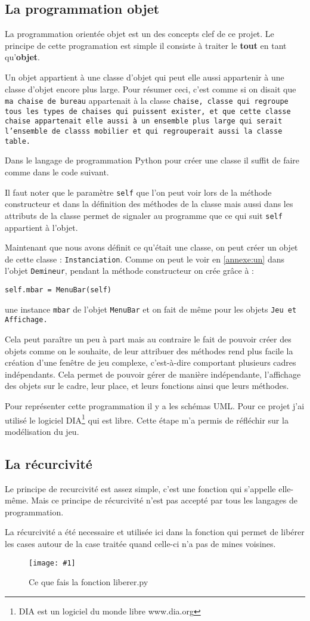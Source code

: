 \documentclass[a4paper,11pt]{article}
\newcommand{\moncode}[1]{}
\newcommand{\monimage}[4]{
\par\noindent
\begin{figure}[H] %
\begin{center}
\texttt{[image: \#1]} %
\caption{#2} %
\label{#3} %
\end{center}
\end{figure} %
}
\newcommand{\ml}[0]{\par\noindent}
\begin{document}
\subsection{La programmation objet}
La programmation orientée objet est un des concepts clef de ce projet. Le principe de cette programation est simple il consiste à  traiter 
le {\bf tout} en tant qu'{\bf objet}.
\ml
Un objet appartient à une classe d'objet qui peut elle aussi appartenir à une classe d'objet encore plus large.
Pour résumer ceci, c'est comme si on disait que {\tt ma chaise de bureau} appartenait à la classe \tt{chaise}, classe qui
regroupe tous les types de chaises qui puissent exister, et que cette classe {\tt chaise} appartenait elle aussi
à un ensemble plus large qui serait l'ensemble de classs {\tt mobilier} et qui regrouperait aussi la classe \tt{table}.
\ml
Dans le langage de programmation Python pour créer une classe il suffit de faire comme dans le code suivant.
\moncode{defclass.py}
Il faut noter que le paramètre {\tt self} que l'on peut voir lors de la méthode constructeur et dans la définition des 
méthodes de la classe mais aussi dans les attributs de la classe permet de signaler au programme que ce qui suit
{\tt self} appartient à l'objet.
\ml
Maintenant que nous avons définit ce qu'était une classe, on peut créer un objet de cette classe : {\tt Instanciation}.
Comme on peut le voir en \ref{annexe:un} dans l'objet {\tt Demineur}, pendant la méthode constructeur on crée grâce à :
\ml
{\tt self.mbar = MenuBar(self)}
\ml
 une instance {\tt mbar} de l'objet {\tt MenuBar} et on fait de même pour les objets \tt{Jeu} et \tt{Affichage}.
\ml
Cela peut paraître un peu à part mais au contraire le fait de pouvoir créer des objets comme on le souhaite, de leur attribuer
des méthodes rend plus facile la création d'une fenêtre de jeu complexe, c'est-à-dire comportant plusieurs cadres indépendants. Cela
permet de pouvoir gérer de manière indépendante, l'affichage des objets sur le cadre, leur place, et leurs fonctions ainsi que leurs méthodes.
\ml
Pour représenter cette programmation il y a les schémas UML. Pour ce projet j'ai utilisé le logiciel DIA\footnote{DIA est un logiciel du monde libre www.dia.org} qui est
libre. Cette étape m'a permis de réfléchir sur la modélisation du jeu.
\ml
\subsection{La récurcivité}
Le principe de recurcivité est assez simple, c'est une fonction qui s'appelle elle-même. Mais ce principe de récurcivité
n'est pas accepté par tous les langages de programmation. 
\ml
La récurcivité a été necessaire et utilisée ici dans la fonction qui permet de libérer les cases autour de la case traitée quand
celle-ci n'a pas de mines voisines. 
\ml 
\monimage{liberer.png}{Ce que fais la fonction liberer.py}{liberer}{10}
\end{document}
